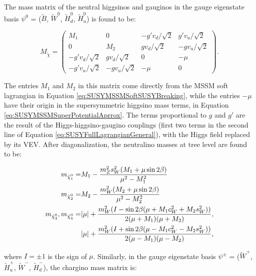 The mass matrix of the neutral higgsinos and gauginos in the gauge eigenstate basis $\psi^0$ = ($\tilde{B}$, $\tilde{W}^0$, $\tilde{H}_d^0$, $\tilde{H}_u^0$) is found to be:

\begin{equation}
M_{\tilde{\chi}} = 
\left(\begin{matrix}
M_1             & 0             & -g'v_d/\sqrt{2} & g'v_u/\sqrt{2} \\
0               & M_2           & g v_d/\sqrt{2}  & -gv_u/\sqrt{2} \\
-g'v_d/\sqrt{2} & gv_d/\sqrt{2} & 0               & -\mu \\
-g'v_u/\sqrt{2} & -gv_u/\sqrt{2}& -\mu            & 0 
\end{matrix}\right).
\label{eq:SUSYMSSMNeutralinoMassMatrix}
\end{equation}

The entries $M_1$ and $M_2$ in this matrix come directly from the MSSM soft lagrangian in Equation \ref{eq:SUSYMSSMSoftSUSYBreaking}, while the entries $-\mu$ have their origin in the supersymmetric higgsino mass terms, in Equation \ref{eq:SUSYMSSMSuperPotentialAprrox}.
The terms proportional to $g$ and $g'$ are the result of the Higgs-higgsino-gaugino couplings (first two terms in the second line of Equation \ref{eq:SUSYFullLagrangianGeneral}), with the Higgs field replaced by its VEV.
After diagonalization, the neutralino masses at tree level are found to be:

\begin{equation}
\begin{split}
m_{\ninoone} = & M_1 - \frac{m^2_Z s^2_W (M_1 + \mu \sin{2\beta})}{\mu^2 - M_1^2} \\
m_{\ninotwo} = & M_2 - \frac{m^2_W (M_2 + \mu \sin{2\beta})}{\mu^2 - M_2^2} \\
m_{\ninothree} , m_{\ninofour}  = & |\mu| + \frac{m^2_W (I - \sin{2\beta}(\mu + M_1 c^2_W + M_2 s^2_W))}{2(\mu + M_1)(\mu + M_2)}, \\
                                  & |\mu| + \frac{m^2_W (I + \sin{2\beta}(\mu - M_1 c^2_W - M_2 s^2_W))}{2(\mu - M_1)(\mu - M_2)},
\end{split}
\label{eq:SUSYMSSMNeutralinoMasses}
\end{equation}

\noindent where $I= \pm 1$ is the sign of $\mu$.
Similarly, in the gauge eigenstate basis  $\psi^\pm$ = ($\tilde{W}^+$, $\tilde{H}^+_u$, $\tilde{W}^-$, $\tilde{H}_d^-$), the chargino mass matrix is:

